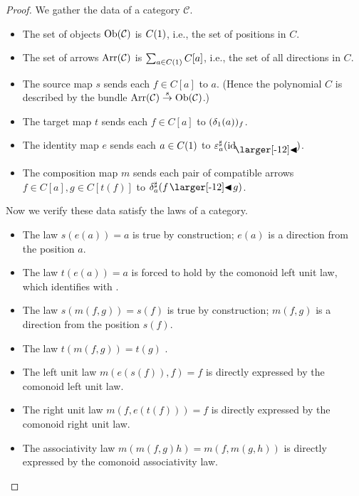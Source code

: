 \documentclass{amsart}
\begin{document}
\begin{proof}
  We gather the data of a category $\mathcal{C}$.
  \begin{itemize}
  \item The set of objects $\operatorname{Ob}(\mathcal{C})$ is $C(1)$, i.e., the set
    of positions in $C$.
  \item The set of arrows $\operatorname{Arr}(\mathcal{C})$ is
    $\sum_{a \in C(1)}C[a]$, i.e., the set of all directions in $C$.
  \item The source map $s$ sends each $f \in C[a]$ to $a$. (Hence the
    polynomial $C$ is described by the bundle
    $\operatorname{Arr}(\mathcal{C}) \overset{s}{\to} \operatorname{Ob}(\mathcal{C})$.)
  \item The target map $t$ sends each $f \in C[a]$ to $({\delta}_1(a))_f$.
  \item The identity map $e$ sends each $a \in C(1)$ to
    $\dirmap{\varepsilon}{a}{\idsubd}$.
  \item The composition map $m$ sends each pair of compatible
    arrows ${f \in C[a]}, {g \in C[t(f)]}$ to $\dirmap{\delta}{a}{f \subd g}$.
  \end{itemize}

  Now we verify these data satisfy the laws of a category.
  \begin{itemize}
  \item The law $s(e(a)) = a$ is true by construction; $e(a)$ is a
    direction from the position $a$.
  \item The law $t(e(a)) = a$ is forced to hold by the comonoid left
    unit law, which identifies  with .
  \item The law $s(m(f, g)) = s(f)$ is true by construction; $m(f, g)$
    is a direction from the position $s(f)$.
  \item The law $t(m(f, g)) = t(g)$ .
  \item The left unit law $m(e(s(f)), f) = f$ is directly expressed by
    the comonoid left unit law.
  \item The right unit law $m(f, e(t(f))) = f$ is directly expressed by
    the comonoid right unit law.
  \item The associativity law $m(m(f, g) h) = m(f, m(g, h))$ is directly
    expressed by the comonoid associativity law.
  \end{itemize}

  \begin{center}
\end{center}
\end{proof}
\end{document}
